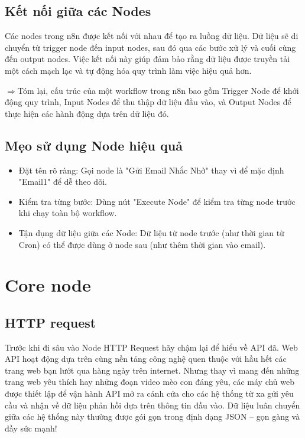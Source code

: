 \subsection{Kết nối giữa các Nodes}

Các nodes trong n8n được kết nối với nhau để tạo ra luồng dữ liệu. Dữ liệu sẽ di chuyển từ trigger node đến input nodes, sau đó qua các bước xử lý và cuối cùng đến output nodes. Việc kết nối này giúp đảm bảo rằng dữ liệu được truyền tải một cách mạch lạc và tự động hóa quy trình làm việc hiệu quả hơn.

$\Rightarrow$Tóm lại, cấu trúc của một workflow trong n8n bao gồm Trigger Node để khởi động quy trình, Input Nodes để thu thập dữ liệu đầu vào, và Output Nodes để thực hiện các hành động dựa trên dữ liệu đó.


\subsection{Mẹo sử dụng Node hiệu quả}

\begin{itemize}
    \item Đặt tên rõ ràng: Gọi node là "Gửi Email Nhắc Nhở" thay vì để mặc định "Email1" để dễ theo dõi.
    \item Kiểm tra từng bước: Dùng nút "Execute Node" để kiểm tra từng node trước khi chạy toàn bộ workflow.
    \item Tận dụng dữ liệu giữa các Node: Dữ liệu từ node trước (như thời gian từ Cron) có thể được dùng ở node sau (như thêm thời gian vào email).
\end{itemize}


\section{Core node}

\subsection{HTTP request}
Trước khi đi sâu vào Node HTTP Request hãy chậm lại để hiểu về API đã. Web API hoạt động dựa trên cùng nền tảng công nghệ quen thuộc với hầu hết các trang web bạn lướt qua hàng ngày trên internet. Nhưng thay vì mang đến những trang web yêu thích hay những đoạn video mèo con đáng yêu, các máy chủ web được thiết lập để vận hành API mở ra cánh cửa cho các hệ thống từ xa gửi yêu cầu và nhận về dữ liệu phản hồi dựa trên thông tin đầu vào. Dữ liệu luân chuyển giữa các hệ thống này thường được gói gọn trong định dạng JSON – gọn gàng và đầy sức mạnh!

